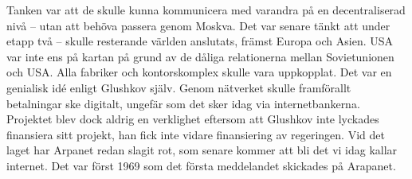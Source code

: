 \documentclass[a4paper,11pt]{article}
\begin{document}
Tanken var att de skulle kunna kommunicera med varandra på en decentraliserad
nivå -- utan att behöva passera genom Moskva. Det var senare tänkt att under
etapp två -- skulle resterande världen anslutats, främst Europa och Asien. USA
var inte ens på kartan på grund av de dåliga relationerna mellan Sovietunionen
och USA. Alla fabriker och kontorskomplex skulle vara uppkopplat. Det var en
genialisk idé enligt Glushkov själv. Genom nätverket skulle framförallt
betalningar ske digitalt, ungefär som det sker idag via internetbankerna.
Projektet blev dock aldrig en verklighet eftersom att Glushkov inte lyckades
finansiera sitt projekt, han fick inte vidare finansiering av regeringen. Vid
det laget har Arpanet redan slagit rot, som senare kommer att bli det vi idag
kallar internet. Det var först 1969 som det första meddelandet skickades på
Arapanet. 
\end{document}
